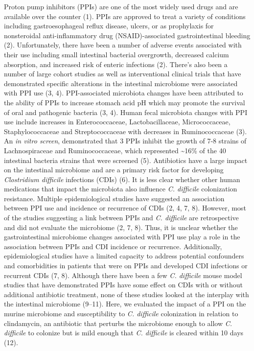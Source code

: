 \documentclass[11pt,]{article}
\begin{document}
Proton pump inhibitors (PPIs) are one of the most widely used drugs and
are available over the counter (1). PPIs are approved to treat a variety
of conditions including gastroesophageal reflux disease, ulcers, or as
prophylaxis for nonsteroidal anti-inflammatory drug (NSAID)-associated
gastrointestinal bleeding (2). Unfortunately, there have been a number
of adverse events associated with their use including small intestinal
bacterial overgrowth, decreased calcium absorption, and increased risk
of enteric infections (2). There's also been a number of large cohort
studies as well as interventional clinical trials that have demonstrated
specific alterations in the intestinal microbiome were associated with
PPI use (3, 4). PPI-associated microbiota changes have been attributed
to the ability of PPIs to increase stomach acid pH which may promote the
survival of oral and pathogenic bacteria (3, 4). Human fecal microbiota
changes with PPI use include increases in Enterococcaceae,
Lactobacillaceae, Micrococcaceae, Staphylococcaceae and Streptococcaceae
with decreases in Ruminococcaceae (3). An \emph{in vitro screen},
demonstrated that 3 PPIs inhibit the growth of 7-8 strains of
Lachnospiraceae and Ruminococcaceae, which represented
\textasciitilde{}16\% of the 40 intestinal bacteria strains that were
screened (5). Antibiotics have a large impact on the intestinal
microbiome and are a primary risk factor for developing
\emph{Clostridium difficile} infections (CDIs) (6). It is less clear
whether other human medications that impact the microbiota also
influence \emph{C. difficile} colonization resistance. Multiple
epidemiological studies have suggested an association between PPI use
and incidence or recurrence of CDIs (2, 4, 7, 8). However, most of the
studies suggesting a link between PPIs and \emph{C. difficile} are
retrospective and did not evaluate the microbiome (2, 7, 8). Thus, it is
unclear whether the gastrointestinal microbiome changes associated with
PPI use play a role in the association between PPIs and CDI incidence or
recurrence. Additionally, epidemiological studies have a limited
capacity to address potential confounders and comorbidities in patients
that were on PPIs and developed CDI infections or recurrent CDIs (7, 8).
Although there have been a few \emph{C. difficile} mouse model studies
that have demonstrated PPIs have some effect on CDIs with or without
additional antibiotic treatment, none of these studies looked at the
interplay with the intestinal microbiome (9--11). Here, we evaluated the
impact of a PPI on the murine microbiome and susceptibility to \emph{C.
difficile} colonization in relation to clindamycin, an antibiotic that
perturbs the microbiome enough to allow \emph{C. difficile} to colonize
but is mild enough that \emph{C. difficile} is cleared within 10 days
(12).
\end{document}
